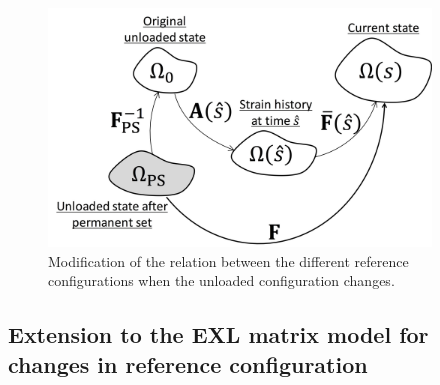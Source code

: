 \begin{figure}[hbt]
\centering
\includegraphics[width=4in]{Images/chapter4/figure8}
\caption{Modification of the relation between the different reference configurations when the unloaded configuration changes.}
\label{fig:PSevolution}
\end{figure}



\subsection{Extension to the EXL matrix model for changes in reference configuration}

